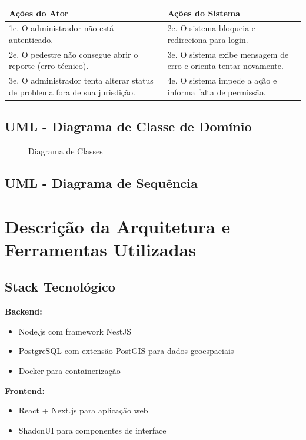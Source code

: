 \documentclass[12pt,a4paper]{article}
\begin{document}
\begin{longtable}{|>{\raggedright\arraybackslash}p{7cm}|>{\raggedright\arraybackslash}p{7cm}|}
\hline
\textbf{Ações do Ator} & \textbf{Ações do Sistema} \\
\hline
1e. O administrador não está autenticado. & 2e. O sistema bloqueia e redireciona para login. \\
\hline
2e. O pedestre não consegue abrir o reporte (erro técnico). & 3e. O sistema exibe mensagem de erro e orienta tentar novamente. \\
\hline
3e. O administrador tenta alterar status de problema fora de sua jurisdição. & 4e. O sistema impede a ação e informa falta de permissão. \\
\hline
\end{longtable}

\subsection{UML - Diagrama de Classe de Domínio}

\begin{figure}[H]
\centering

\caption{Diagrama de Classes}
\end{figure}

\subsection{UML - Diagrama de Sequência}

\section{Descrição da Arquitetura e Ferramentas Utilizadas}
\label{sec:arquitetura}

\subsection{Stack Tecnológico}

\textbf{Backend:}
\begin{itemize}
    \item Node.js com framework NestJS
    \item PostgreSQL com extensão PostGIS para dados geoespaciais
    \item Docker para containerização
\end{itemize}

\textbf{Frontend:}
\begin{itemize}
    \item React + Next.js para aplicação web
    \item ShadcnUI para componentes de interface
\end{itemize}
\end{document}
